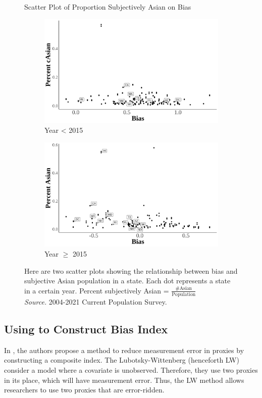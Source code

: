 \begin{figure}[H]
    \centering
    \caption{Scatter Plot of Proportion Subjectively Asian on Bias}
    \label{scatter-plot-1}
    \begin{subfigure}{.9\textwidth}
    \caption{Year < 2015}
    \centering
    \includegraphics[width=.9\linewidth]{scatter-plot-bias-Asian-less2015.png}
    \end{subfigure}
    \centering
    \begin{subfigure}{.9\textwidth}
    \caption{Year $\geq$ 2015}
    \centering
    \includegraphics[width=.9\linewidth]{scatter-plot-bias-Asian-great2015.png}
    \end{subfigure}
    \caption*{\footnotesize{Here are two scatter plots showing the relationship between bias and subjective Asian population in a state. Each dot represents a state in a certain year. Percent subjectively Asian = $\frac{\# \text{Asian}}{\text{Population}}$ \\
    \emph{Source.} 2004-2021 Current Population Survey.}}
    \end{figure}
    
\subsection{Using \textcite{lubotskyInterpretationRegressionsMultiple2006} to Construct Bias Index} %
\label{sub:lw-bias}
In \textcite{lubotskyInterpretationRegressionsMultiple2006}, the authors propose a method to reduce measurement error in proxies by constructing a composite index. The Lubotsky-Wittenberg (henceforth LW) consider a model where a covariate is unobserved. Therefore, they use two proxies in its place, which will have measurement error. Thus, the LW method allows researchers to use two proxies that are error-ridden. 


